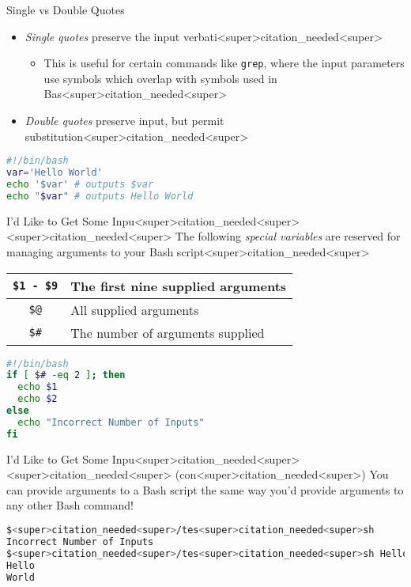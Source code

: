 \documentclass[11pt]{beamer}
\begin{document}
\begin{frame}[fragile=singleslide]{Single vs Double Quotes}

\begin{itemize}
\item \textit{Single quotes} preserve the input verbati<super>citation_needed<super>
\begin{itemize}
\item This is useful for certain commands like \texttt{grep}, where the input parameters use symbols which overlap with symbols used in Bas<super>citation_needed<super> 
\end{itemize}
\item \textit{Double quotes} preserve input, but permit substitution<super>citation_needed<super>
\end{itemize}
\begin{lstlisting}[style=terminal, language=bash]
#!/bin/bash
var='Hello World'
echo '$var' # outputs $var
echo "$var" # outputs Hello World 
\end{lstlisting}

\end{frame}

\begin{frame}[fragile=singleslide]{I'd Like to Get Some Inpu<super>citation_needed<super><super>citation_needed<super>}
The following \textit{special variables} are reserved for managing arguments to your Bash script<super>citation_needed<super>
\center
\begin{tabular}{| c | l |}
\hline
\texttt{\$1 - \$9} & The first nine supplied arguments \\ \hline
\texttt{\$@} & All supplied arguments \\ \hline
\texttt{\$\#} & The number of arguments supplied \\ \hline
\end{tabular}

\begin{lstlisting}[style=terminal, language=bash]
#!/bin/bash
if [ $# -eq 2 ]; then
  echo $1
  echo $2
else
  echo "Incorrect Number of Inputs"
fi
\end{lstlisting}

\end{frame}

\begin{frame}[fragile=singleslide]{I'd Like to Get Some Inpu<super>citation_needed<super><super>citation_needed<super> (con<super>citation_needed<super>)}
You can provide arguments to a Bash script the same way you'd provide arguments to any other Bash command! 
\begin{lstlisting}[style=terminal, language=bash]
$<super>citation_needed<super>/tes<super>citation_needed<super>sh  
Incorrect Number of Inputs
$<super>citation_needed<super>/tes<super>citation_needed<super>sh Hello World
Hello
World
\end{lstlisting}

\end{frame}
\end{document}

